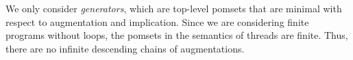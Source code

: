 We only consider \emph{generators}, which are top-level pomsets that are
minimal with respect to augmentation and implication.  Since we are
considering finite programs without loops, the pomsets in the semantics of
threads are finite.  Thus, there are no infinite descending chains of
augmentations.



